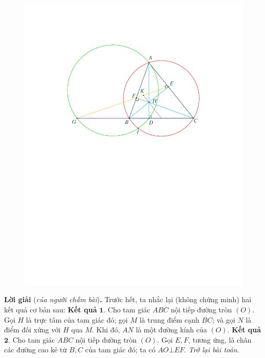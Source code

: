 \begin{multicols}{2}
\begin{figure}[H]
		\includegraphics[width= 0.99\linewidth]{P595}
		\vspace*{-10pt}
	\end{figure}
	\textbf{\color{thachthuctoanhoc}Lời giải} (\textit{của người chấm bài})\textbf{\color{thachthuctoanhoc}.}
	\vskip 0.05cm
	Trước hết, ta nhắc lại (không chứng minh) hai kết quả cơ bản sau:
	\vskip 0.05cm
	\textbf{\color{thachthuctoanhoc}Kết quả} $\pmb{1.}$ Cho tam giác $ABC$ nội tiếp đường tròn $(O)$. Gọi $H$ là trực tâm của tam giác đó; gọi $M$ là trung điểm cạnh $BC$; và gọi $N$ là điểm đối xứng với $H$ qua $M$. Khi đó, $AN$ là một đường kính của $(O)$.
	\vskip 0.05cm
	\textbf{\color{thachthuctoanhoc}Kết quả} $\pmb{2.}$ Cho tam giác $ABC$ nội tiếp đường tròn $(O)$. Gọi $E, F$, tương ứng, là chân các đường cao kẻ từ $B, C$ của tam giác đó; ta có $AO \bot EF$.
	\vskip 0.05cm
	\textit{Trở lại bài toán}.
	\begin{figure}[H]
		\vspace*{-5pt}
		\centering
		\captionsetup{labelformat= empty, justification=centering}

\end{figure}
\end{multicols}

